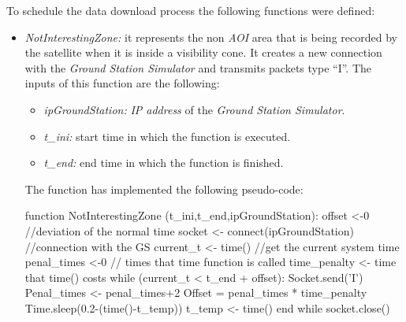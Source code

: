 To schedule the data download process the following functions were defined:
\begin{itemize}
\item \emph{NotInterestingZone:}  it represents the non \emph{AOI} area that is
  being recorded by the satellite when it is inside a visibility cone. It
  creates a new connection with the \emph{Ground Station Simulator} and
  transmits packets type ``I''. The inputs of this function are the following:
\begin{itemize}
\item \emph{ipGroundStation:} \emph{IP address} of the \emph{Ground Station Simulator}.
\item \emph{t\_ini:} start time in which the function is executed.
\item \emph{t\_end:} end time in which the function is finished.
\end{itemize}

The function has implemented the following pseudo-code:

\begin{listing}[
  float=h!,
  caption  = {Pseudocode of \emph{NotInterestingZone} function},
  label    = code:sss-notinterestingzone,
style=customc]
function NotInterestingZone (t_ini,t_end,ipGroundStation):
offset <-0 //deviation of the normal time 
socket <- connect(ipGroundStation) //connection with the GS
current_t <- time() //get the current system time
penal_times <-0 // times that time function is called
time_penalty <- time that time() costs
while (current_t  <  t_end + offset):
	Socket.send('I')
	Penal_times <- penal_times+2
	Offset = penal_times * time_penalty
	Time.sleep(0.2-(time()-t_temp))
	t_temp <- time()
end while
socket.close()
\end{listing}


\end{itemize}
